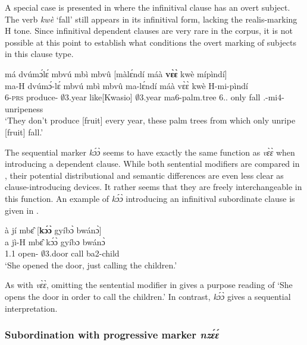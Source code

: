 A special case is presented in  where the infinitival clause has an overt subject. The verb {\itshape kwè} `fall'  still appears in its infinitival form, lacking the realis-marking H tone. Since infinitival dependent clauses are very rare in the corpus, it is not possible at this point to establish what conditions the overt marking of subjects in this clause type.


\ea\label{InfAdv4} 
  \glll  má dvúmɔ́lɛ́ mbvú mbì mbvû [màlɛ́ndí máà {\bfseries vɛ̀ɛ̀} kwè mípìndí]\textsubscript{{\SUB}} \\
        ma-H dvúmɔ́-lɛ́ mbvú mbì mbvû {\db}ma-lɛ́ndí máà vɛ̀ɛ̀ kwè H-mi-pìndí \\
           6-\textsc{prs} produce-{\NEG}  $\emptyset$3.year like[Kwasio] $\emptyset$3.year {\db}ma6-palm.tree 6.{\DEM}.{\PROX} only fall {\OBJ}.{\LINK}-mi4-unripeness\\
    \trans `They don't produce [fruit] every year, these palm trees from which only unripe [fruit] fall.'
\z

The sequential marker {\itshape kɔ́ɔ̀} seems to have exactly the same function as {\itshape vɛ̀ɛ̀} when introducing a dependent clause. While both sentential modifiers are compared in , their potential distributional and semantic differences are even less clear as clause-introducing devices. It rather seems that they are freely interchangeable in this function. An example of {\itshape kɔ́ɔ̀} introducing an  infinitival subordinate clause is given in .



\ea\label{InfAdv5} 
  \glll  à jí mbɛ̂ [{\bfseries kɔ́ɔ̀} gyíbɔ̀ bwánɔ̀]\textsubscript{{\SUB}} \\
         a jì-H mbɛ̂ {\db}kɔ́ɔ̀ gyíbɔ bwánɔ̀ \\
           1.{\PST}1 open-{\R} $\emptyset$3.door {\db}{\SEQU} call ba2-child \\
    \trans `She opened the door, just calling the children.'
\z

As with {\itshape vɛ̀ɛ̀}, omitting the sentential modifier in  gives a purpose reading of `She opens the door in order to call the children.' In contrast, {\itshape kɔ́ɔ̀} gives a sequential interpretation.


\subsubsection{Subordination with progressive marker {\itshape nzɛ́ɛ́}}
\label{sec:SUBnzee}

